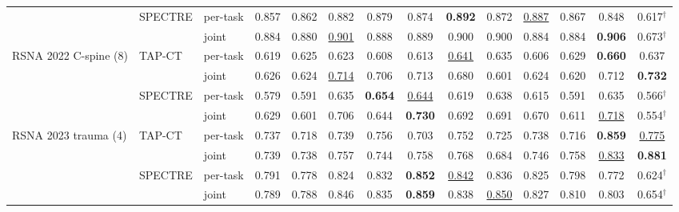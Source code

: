 \begin{tabular}{@{}lllccccccccccc@{}}
\addlinespace[1.5pt]
 & SPECTRE & per-task & 0.857 & 0.862 & 0.882 & 0.879 & 0.874 & \textbf{0.892} & 0.872 & \cellcolor{modebest}\underline{0.887} & 0.867 & 0.848 & 0.617$^{\dagger}$ \\
 &  & joint & \cellcolor{modebest}0.884 & \cellcolor{modebest}0.880 & \cellcolor{modebest}\underline{0.901} & \cellcolor{modebest}0.888 & \cellcolor{modebest}0.889 & \cellcolor{modebest}0.900 & \cellcolor{modebest}0.900 & 0.884 & \cellcolor{modebest}0.884 & \cellcolor{modebest}\textbf{0.906} & 0.673$^{\dagger}$ \\
\addlinespace
RSNA 2022 C-spine (8) & TAP-CT & per-task & 0.619 & \cellcolor{modebest}0.625 & 0.623 & 0.608 & 0.613 & \underline{0.641} & \cellcolor{modebest}0.635 & 0.606 & \cellcolor{modebest}0.629 & \textbf{0.660} & 0.637 \\
 &  & joint & \cellcolor{modebest}0.626 & 0.624 & \cellcolor{modebest}\underline{0.714} & \cellcolor{modebest}0.706 & \cellcolor{modebest}0.713 & \cellcolor{modebest}0.680 & 0.601 & \cellcolor{modebest}0.624 & 0.620 & \cellcolor{modebest}0.712 & \cellcolor{modebest}\textbf{0.732} \\
\addlinespace[1.5pt]
 & SPECTRE & per-task & 0.579 & 0.591 & 0.635 & \cellcolor{modebest}\textbf{0.654} & \underline{0.644} & 0.619 & 0.638 & 0.615 & 0.591 & 0.635 & 0.566$^{\dagger}$ \\
 &  & joint & \cellcolor{modebest}0.629 & \cellcolor{modebest}0.601 & \cellcolor{modebest}0.706 & 0.644 & \cellcolor{modebest}\textbf{0.730} & \cellcolor{modebest}0.692 & \cellcolor{modebest}0.691 & \cellcolor{modebest}0.670 & \cellcolor{modebest}0.611 & \cellcolor{modebest}\underline{0.718} & 0.554$^{\dagger}$ \\
\addlinespace
RSNA 2023 trauma (4) & TAP-CT & per-task & 0.737 & 0.718 & 0.739 & \cellcolor{modebest}0.756 & 0.703 & 0.752 & \cellcolor{modebest}0.725 & 0.738 & 0.716 & \cellcolor{modebest}\textbf{0.859} & \underline{0.775} \\
 &  & joint & \cellcolor{modebest}0.739 & \cellcolor{modebest}0.738 & \cellcolor{modebest}0.757 & 0.744 & \cellcolor{modebest}0.758 & \cellcolor{modebest}0.768 & 0.684 & \cellcolor{modebest}0.746 & \cellcolor{modebest}0.758 & \underline{0.833} & \cellcolor{modebest}\textbf{0.881} \\
\addlinespace[1.5pt]
 & SPECTRE & per-task & \cellcolor{modebest}0.791 & 0.778 & 0.824 & 0.832 & \textbf{0.852} & \cellcolor{modebest}\underline{0.842} & 0.836 & 0.825 & 0.798 & 0.772 & 0.624$^{\dagger}$ \\
 &  & joint & 0.789 & \cellcolor{modebest}0.788 & \cellcolor{modebest}0.846 & \cellcolor{modebest}0.835 & \cellcolor{modebest}\textbf{0.859} & 0.838 & \cellcolor{modebest}\underline{0.850} & \cellcolor{modebest}0.827 & \cellcolor{modebest}0.810 & \cellcolor{modebest}0.803 & 0.654$^{\dagger}$ \\

\end{tabular}
